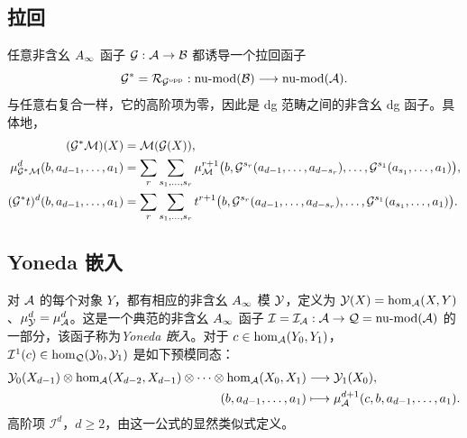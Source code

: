 \subsection{拉回}\label{sec:1k}
\begin{definition*}
任意非含幺 $A_\infty$ 函子 $\mathcal G:\mathcal A\to\mathcal B$ 都诱导一个拉回函子
\begin{equation}\label{eq:1.22}
\mathcal G^*=\mathcal R_{\mathcal G^{\mathrm{opp}}}:\operatorname{nu\text{-}mod}(\mathcal B)\longrightarrow\operatorname{nu\text{-}mod}(\mathcal A).
\end{equation}
与任意右复合一样，它的高阶项为零，因此是 dg 范畴之间的非含幺 dg 函子。具体地，
\[
\begin{aligned}
(\mathcal G^*\mathcal M)(X)&=\mathcal M(\mathcal G(X)),\\
\mu^d_{\mathcal G^*\mathcal M}(b,a_{d-1},\ldots,a_1)
&=\sum_r\sum_{s_1,\ldots,s_r}\mu^{r+1}_{\mathcal M}\bigl(b,\mathcal G^{s_r}(a_{d-1},\ldots,a_{d-s_r}),\ldots,\mathcal G^{s_1}(a_{s_1},\ldots,a_1)\bigr),\\
(\mathcal G^*t)^d(b,a_{d-1},\ldots,a_1)
&=\sum_r\sum_{s_1,\ldots,s_r}t^{r+1}\bigl(b,\mathcal G^{s_r}(a_{d-1},\ldots,a_{d-s_r}),\ldots,\mathcal G^{s_1}(a_{s_1},\ldots,a_1)\bigr).
\end{aligned}
\]
\end{definition*}

\subsection{Yoneda 嵌入}\label{sec:1l}
\begin{definition*}
对 $\mathcal A$ 的每个对象 $Y$，都有相应的非含幺 $A_\infty$ 模 $\mathcal Y$，定义为 $\mathcal Y(X)=\hom_{\mathcal A}(X,Y)$、$\mu^d_{\mathcal Y}=\mu^d_{\mathcal A}$。这是一个典范的非含幺 $A_\infty$ 函子 $\mathcal I=\mathcal I_{\mathcal A}:\mathcal A\to\mathcal Q=\operatorname{nu\text{-}mod}(\mathcal A)$ 的一部分，该函子称为\emph{Yoneda 嵌入}。对于 $c\in\hom_{\mathcal A}(Y_0,Y_1)$，$\mathcal I^1(c)\in\hom_{\mathcal Q}(\mathcal Y_0,\mathcal Y_1)$ 是如下预模同态：
\[
\begin{aligned}
\mathcal Y_0(X_{d-1})\otimes\hom_{\mathcal A}(X_{d-2},X_{d-1})\otimes\cdots\otimes\hom_{\mathcal A}(X_0,X_1)&\longrightarrow\mathcal Y_1(X_0),\\
(b,a_{d-1},\ldots,a_1)&\longmapsto\mu^{d+1}_{\mathcal A}(c,b,a_{d-1},\ldots,a_1).
\end{aligned}
\]
高阶项 $\mathcal I^d$，$d\ge2$，由这一公式的显然类似式定义。
\end{definition*}

